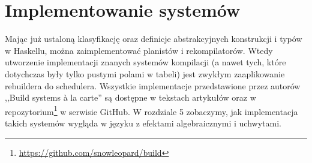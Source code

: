 \section{Implementowanie systemów}

Mając już ustaloną klasyfikację oraz definicje abstrakcyjnych konstrukcji i typów w Haskellu, można zaimplementować planistów i rekompilatorów. Wtedy utworzenie implementacji znanych systemów kompilacji (a nawet tych, które dotychczas były tylko pustymi polami w tabeli) jest zwykłym zaaplikowanie rebuildera do schedulera. Wszystkie implementacje przedstawione przez autorów ,,Build systems {\`a} la carte'' są dostępne w tekstach artykułów \cite{mokhov2018build, mokhov2020build} oraz w repozytorium\footnote{\url{https://github.com/snowleopard/build}} w serwisie GitHub. W rozdziale 5 zobaczymy, jak implementacja takich systemów wygląda w języku z efektami algebraicznymi i uchwytami.
